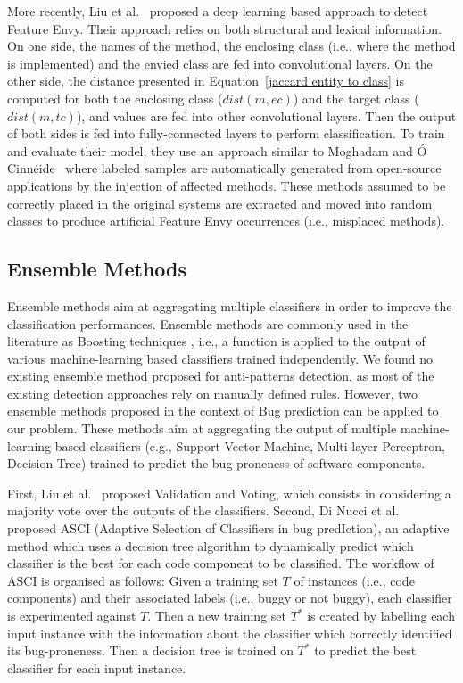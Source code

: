 More recently, Liu et al.~\cite{liu2018deep} proposed a deep learning based approach to detect Feature Envy. Their approach relies on both structural and lexical information. On one side, the names of the method, the enclosing class (i.e., where the method is implemented) and the envied class are fed into convolutional layers. On the other side, the distance presented in Equation~\ref{jaccard entity to class} is computed for both the enclosing class ($dist(m, ec)$) and the target class ($dist(m, tc)$), and values are fed into other convolutional layers. Then the output of both sides is fed into fully-connected layers to perform classification. To train and evaluate their model, they use an approach similar to Moghadam and Ó Cinnéide~\cite{moghadam2012automated} where labeled samples are automatically generated from open-source applications by the injection of affected methods. These methods assumed to be correctly placed in the original systems are extracted and moved into random classes to produce artificial Feature Envy occurrences (i.e., misplaced methods).

\subsection{Ensemble Methods}
Ensemble methods aim at aggregating multiple classifiers in order to improve the classification performances. Ensemble methods are commonly used in the literature as Boosting techniques \cite{rokach2010ensemble}, i.e., a function is applied to the output of various machine-learning based classifiers trained independently. We found no existing ensemble method proposed for anti-patterns detection, as most of the existing detection approaches rely on manually defined rules. However, two ensemble methods proposed in the context of Bug prediction can be applied to our problem. These methods aim at aggregating the output of multiple machine-learning based classifiers (e.g., Support Vector Machine, Multi-layer Perceptron, Decision Tree) trained to predict the bug-proneness of software components.

First, Liu et al.~\cite{liu2010evolutionary} proposed Validation and Voting, which consists in considering a majority vote over the outputs of the classifiers. Second, Di Nucci et al.~\cite{di2017dynamic} proposed ASCI (Adaptive Selection of Classifiers in bug predIction), an adaptive method which uses a decision tree algorithm to dynamically predict which classifier is the best for each code component to be classified. The workflow of ASCI is organised as follows: Given a training set $T$ of instances (i.e., code components) and their associated labels (i.e., buggy or not buggy), each classifier is experimented against $T$. Then a new training set $T^{*}$ is created by labelling each input instance with the information about the classifier which correctly identified its bug-proneness. Then a decision tree is trained on $T^{*}$ to predict the best classifier for each input instance.    

